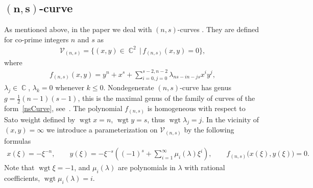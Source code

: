 \documentclass[11pt]{article}
\numberwithin{equation}{section}
\DeclareMathOperator{\Complex}{\mathbb{C}}
\DeclareMathOperator{\wgt}{wgt}
\begin{document}
\subsection[$(n,s)$-curve]{$\boldsymbol{(n,s)}$-curve}\label{ss:nsCurve}
As mentioned above, in the paper we deal with $(n,s)$-curves \cite{BEL1999}.
They are defined for co-prime integers $n$ and $s$
as \begin{gather*}\mathcal{V}_{(n,s)}=\big\{(x,y)\in \Complex^2 \,|\, f_{(n,s)}(x,y) =0\big\},\end{gather*} where
\begin{gather}\label{nsCurve}
 f_{(n,s)}(x,y) = y^n + x^s + \sum_{i=0, j=0}^{s-2,n-2} \lambda_{ns-in- js} x^i y^j,
\end{gather}
$\lambda_{j}\in \Complex$, $\lambda_{k}=0$ whenever $k\leqslant 0$. Nondegenerate $(n,s)$-curve has genus $g = \frac{1}{2}(n - 1)(s - 1)$, {this is the maximal genus of the family of curves of the form~\eqref{nsCurve}}, see~\cite{BEL1999}. The polynomial $f_{(n,s)}$ is homogeneous with respect to Sato weight defined by $\wgt x = n$, $\wgt y=s$, thus $\wgt \lambda_j=j$. In the vicinity of $(x,y)=\infty$ we introduce a parameterization on $\mathcal{V}_{(n,s)}$ by the following formulas
\begin{gather*}%
x(\xi)=-\xi^{-n}, \qquad y(\xi)=-\xi^{-s}\left((-1)^s+ \sum_{i=1}^{\infty} \mu_i(\lambda) \xi^i\right), \qquad f_{(n,s)}\big(x(\xi),y(\xi)\big)=0.
\end{gather*}
Note that $\wgt \xi = -1$, and $\mu_i(\lambda)$ are polynomials in $\lambda$ with rational coefficients, $\wgt \mu_i(\lambda) = i$.
\end{document}
